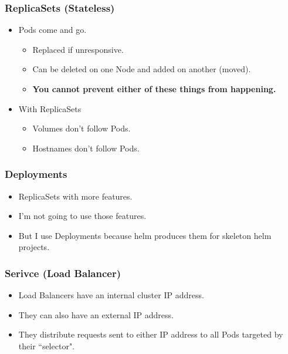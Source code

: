     \begin{frame}
        \frametitle{ReplicaSets (Stateless)}
        \begin{itemize}
            \item Pods come and go.\pause
            \begin{itemize}
                \item Replaced if unresponsive.\pause
                \item Can be deleted on one Node and added on another (moved).\pause
                \item \textbf{You cannot prevent either of these things from happening.}\pause
            \end{itemize}
            \item With ReplicaSets\pause
            \begin{itemize}
                \item Volumes don't follow Pods.\pause
                \item Hostnames don't follow Pods.
            \end{itemize}
        \end{itemize}
    \end{frame}

    \begin{frame}
        \frametitle{Deployments}
        \begin{itemize}
            \item ReplicaSets with more features.\pause
            \item I'm not going to use those features.\pause
            \item But I use Deployments because helm produces them for skeleton helm projects.
        \end{itemize}
    \end{frame}

    \begin{frame}
        \frametitle{Serivce (Load Balancer)}
        \begin{itemize}
            \item Load Balancers have an internal cluster IP address.\pause
            \item They can also have an external IP address.\pause
            \item They distribute requests sent to either IP address to all Pods targeted by their ``selector".
        \end{itemize}
    \end{frame}

